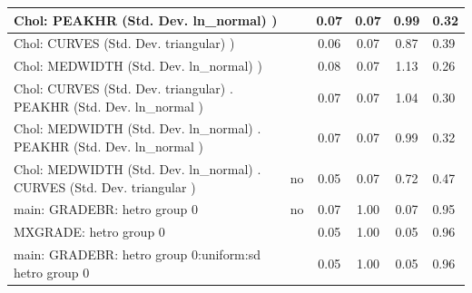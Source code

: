 \begin{table}
\begin{center}
\begin{tabular}{|l|l|c|c|c|l|}
			\hline
			 Chol: PEAKHR (Std. Dev. ln_normal) ) &  & 0.07 & 0.07 & 0.99 & 0.32 \\
			\hline
			 Chol: CURVES (Std. Dev. triangular) ) &  & 0.06 & 0.07 & 0.87 & 0.39 \\
			\hline
			 Chol: MEDWIDTH (Std. Dev. ln_normal) ) &  & 0.08 & 0.07 & 1.13 & 0.26 \\
			\hline
			 Chol: CURVES (Std. Dev. triangular) . PEAKHR (Std. Dev.   ln_normal ) &  & 0.07 & 0.07 & 1.04 & 0.30 \\
			\hline
			 Chol: MEDWIDTH (Std. Dev. ln_normal) . PEAKHR (Std. Dev.   ln_normal ) &  & 0.07 & 0.07 & 0.99 & 0.32 \\
			\hline
			 Chol: MEDWIDTH (Std. Dev. ln_normal) . CURVES (Std. Dev.   triangular ) & no & 0.05 & 0.07 & 0.72 & 0.47 \\
			\hline
			main: GRADEBR: hetro group 0 & no & 0.07 & 1.00 & 0.07 & 0.95 \\
			\hline
			MXGRADE: hetro group 0 &  & 0.05 & 1.00 & 0.05 & 0.96 \\
			\hline
			main: GRADEBR: hetro group 0:uniform:sd  hetro group 0 &  & 0.05 & 1.00 & 0.05 & 0.96 \\
			\hline
		\end{tabular}
	\end{center}
\end{table}